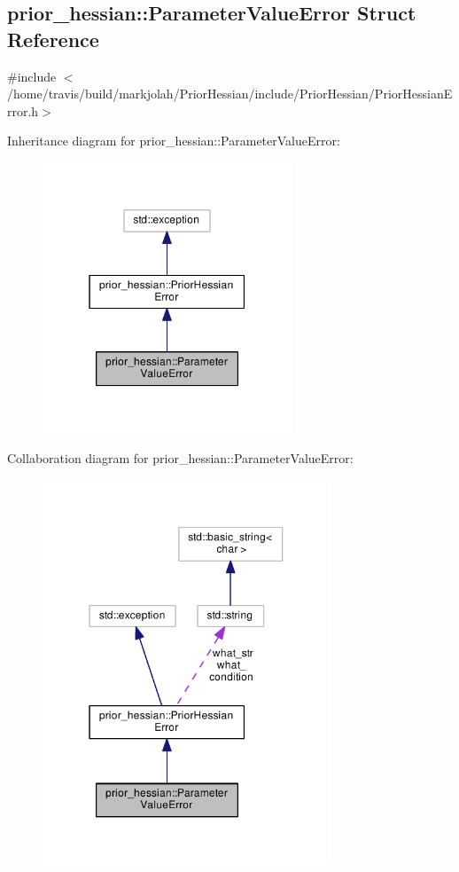 \hypertarget{structprior__hessian_1_1ParameterValueError}{}\subsection{prior\+\_\+hessian\+:\+:Parameter\+Value\+Error Struct Reference}
\label{structprior__hessian_1_1ParameterValueError}


{\ttfamily \#include $<$/home/travis/build/markjolah/\+Prior\+Hessian/include/\+Prior\+Hessian/\+Prior\+Hessian\+Error.\+h$>$}



Inheritance diagram for prior\+\_\+hessian\+:\+:Parameter\+Value\+Error\+:\nopagebreak
\begin{figure}[H]
\begin{center}
\leavevmode
\includegraphics[width=211pt]{structprior__hessian_1_1ParameterValueError__inherit__graph}
\end{center}
\end{figure}


Collaboration diagram for prior\+\_\+hessian\+:\+:Parameter\+Value\+Error\+:\nopagebreak
\begin{figure}[H]
\begin{center}
\leavevmode
\includegraphics[width=244pt]{structprior__hessian_1_1ParameterValueError__coll__graph}
\end{center}
\end{figure}
